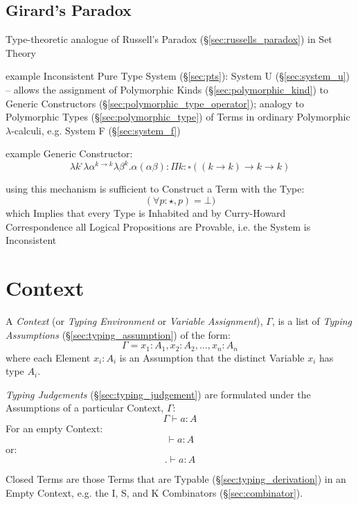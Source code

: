 \subsection{Girard's Paradox}\label{sec:girards_paradox}

Type-theoretic analogue of Russell's Paradox
(\S\ref{sec:russells_paradox}) in Set Theory

example Inconsistent Pure Type System (\S\ref{sec:pts}): System U
(\S\ref{sec:system_u}) -- allows the assignment of Polymorphic Kinds
(\S\ref{sec:polymorphic_kind}) to Generic Constructors
(\S\ref{sec:polymorphic_type_operator}); analogy to Polymorphic Types
(\S\ref{sec:polymorphic_type}) of Terms in ordinary Polymorphic
$\lambda$-calculi, e.g. System F (\S\ref{sec:system_f})

example Generic Constructor:
\[
  \lambda k^\square \lambda \alpha^{k \rightarrow k}\lambda\beta^k.
    \alpha(\alpha\beta) :
  \Pi k:\square((k \rightarrow k) \rightarrow k \rightarrow k)
\]

using this mechanism is sufficient to Construct a Term with the Type:
\[
  (\forall p:\star,p) = \bot)
\]
which Implies that every Type is Inhabited and by Curry-Howard
Correspondence all Logical Propositions are Provable, i.e. the System
is Inconsistent



\section{Context}\label{sec:type_context}

A \emph{Context} (or \emph{Typing Environment} or \emph{Variable
  Assignment}), $\Gamma$, is a list of \emph{Typing Assumptions}
(\S\ref{sec:typing_assumption}) of the form:
\[
  \Gamma = x_1 : A_1, x_2 : A_2, \ldots, x_n : A_n
\]
where each Element $x_i : A_i$ is an Assumption that the distinct
Variable $x_i$ has type $A_i$.

\emph{Typing Judgements} (\S\ref{sec:typing_judgement}) are formulated
under the Assumptions of a particular Context, $\Gamma$:
\[
  \Gamma \vdash a : A
\]
For an empty Context:
\[
  \vdash a : A
\]
or:
\[
  . \vdash a : A
\]

Closed Terms are those Terms that are Typable
(\S\ref{sec:typing_derivation}) in an Empty Context, e.g. the I, S,
and K Combinators (\S\ref{sec:combinator}).



